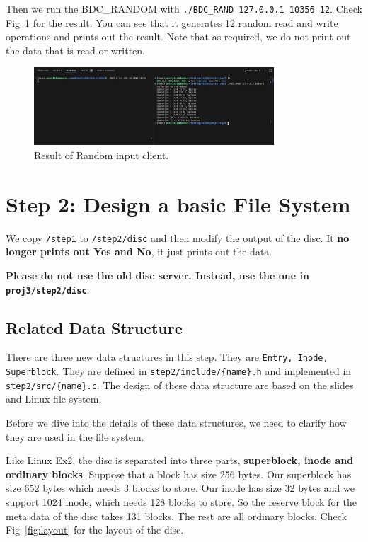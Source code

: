 Then we run the BDC\_RANDOM with \texttt{./BDC\_RAND 127.0.0.1 10356 12}. 
Check Fig~\ref{fig:rnd} for the result. You can see that it generates 12 random read and write operations and prints out the result.
Note that as required, we do not print out the data that is read or written.

\begin{figure}[!h]
    \centering
    \includegraphics[width=0.8\textwidth]{fig/bdc_rnd.png}
    \caption{Result of Random input client.}
    \label{fig:rnd}
\end{figure}

\section{Step 2: Design a basic File System}
We copy \texttt{/step1} to \texttt{/step2/disc} and then modify the output of the disc.
It \textbf{no longer prints out Yes and No}, it just prints out the data. 

\textbf{Please do not use the old disc server. Instead, use the one in \texttt{proj3/step2/disc}}.

\subsection{Related Data Structure}
There are three new data structures in this step. They are \texttt{Entry, Inode, Superblock}. They are defined in \texttt{step2/include/\{name\}.h} and implemented in \texttt{step2/src/\{name\}.c}.
The design of these data structure are based on the slides and Linux file system.

Before we dive into the details of these data structures, we need to clarify how they are used in the file system.

Like Linux Ex2, the disc is separated into three parts, \textbf{superblock, inode and ordinary blocks}. Suppose that a block has size 256 bytes. Our 
superblock has size 652 bytes which needs 3 blocks to store. Our inode has size 32 bytes and we support 1024 inode, which needs 128 blocks to store.
So the reserve block for the meta data of the disc takes 131 blocks. The rest are all ordinary blocks. Check Fig~\ref{fig:layout} for the layout of the disc.

